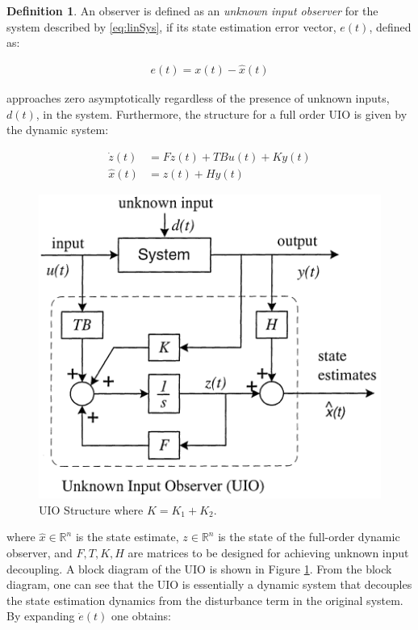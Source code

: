 \documentclass{amsart}
\theoremstyle{definition}
\newtheorem{definition}[theorem]{Definition}
\theoremstyle{remark}
\numberwithin{equation}{section}
\begin{document}
\begin{definition}
An observer is defined as an \textit{unknown input observer} \cite{Sch12,Pat89} for the system described by \ref{eq:linSys}, if its state estimation error vector, $e(t)$, defined as:

\begin{align}
e(t) = x(t) - \hat{x}(t)
\end{align}

approaches zero asymptotically regardless of the presence of unknown inputs, $d(t)$, in the system.  Furthermore, the structure for a full order UIO is given by the dynamic system:

\begin{equation} \label{eq:uio}
\begin{aligned}
\dot{z}(t) &= Fz(t)+TBu(t) + Ky(t) \\
\hat{x}(t) &= z(t)+Hy(t)
\end{aligned}
\end{equation}
\end{definition}

\begin{figure}[H]
    \centering
    \includegraphics[scale=0.4]{UIOArch.png}
    \caption{UIO Structure where $K = K_1 + K_2$.}
    \label{fig:UIOBD}
\end{figure}

where $\hat{x} \in \mathbb{R}^n$ is the state estimate, $z \in \mathbb{R}^n$ is the state of the full-order dynamic observer, and $F,T,K,H$ are matrices to be designed for achieving unknown input decoupling. A block diagram of the UIO is shown in Figure \ref{fig:UIOBD}.  From the block diagram, one can see that the UIO is essentially a dynamic system that decouples the state estimation dynamics from the disturbance term in the original system. By expanding $\dot{e}(t)$ one obtains:
\end{document}
